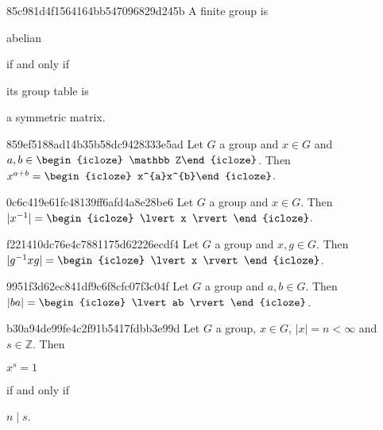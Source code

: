 \begin{note}{85c981d4f1564164bb547096829d245b}
    A finite group is \begin{icloze}{3}abelian\end{icloze} \begin{icloze}{2}if and only if\end{icloze} its group table is \begin{icloze}{1}a symmetric matrix.\end{icloze}
\end{note}

\begin{note}{859ef5188ad14b35b58dc9428333e5ad}
    Let \({ G }\) a group and \({ x \in G }\) and \({ a, b \in \begin{icloze}{2}\mathbb Z\end{icloze} }\). Then \({ x^{a + b} = \begin{icloze}{1}x^{a}x^{b}\end{icloze} }\).
\end{note}

\begin{note}{0c6c419e61fc48139ff6afd4a8e28be6}
    Let \({ G }\) a group and \({ x \in G }\). Then \({ \lvert x^{-1} \rvert = \begin{icloze}{1}\lvert x \rvert\end{icloze} }\).
\end{note}

\begin{note}{f221410dc76e4c7881175d62226ecdf4}
    Let \({ G }\) a group and \({ x, g \in G }\).
    Then \({ \lvert g^{-1} x g \rvert = \begin{icloze}{1}\lvert x \rvert\end{icloze} }\).
\end{note}

\begin{note}{9951f3d62ec841df9c6f8cfc07f3c04f}
    Let \({ G }\) a group and \({ a, b \in G }\).
    Then \({ \lvert ba \rvert = \begin{icloze}{1}\lvert ab \rvert\end{icloze} }\).
\end{note}

\begin{note}{b30a94de99fe4c2f91b5417fdbb3e99d}
    Let \({ G }\) a group, \({ x \in G }\), \({ \lvert x \rvert = n < \infty }\) and \({ s \in \mathbb Z }\).
    Then \begin{icloze}{3}\({ x^{s} = 1 }\)\end{icloze} \begin{icloze}{2}if and only if\end{icloze} \begin{icloze}{1}\({ n \mid s }\).\end{icloze}
\end{note}

